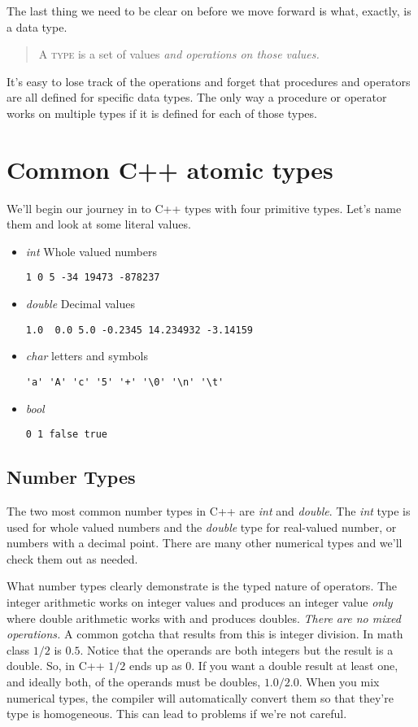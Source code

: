\documentclass[]{tufte-handout}
\begin{document}
The last thing we need to be clear on before we move forward is what, exactly, is a data type.  
\begin{quote}
A \textsc{type} is a set of values \textit{and operations on those values.}  
\end{quote}
It's easy to lose track of the operations and forget that procedures and operators are all defined for specific data types.  The only way a procedure or operator works on multiple types if it is defined for each of those types. 

\section{Common C++ atomic types}

We'll begin our journey in to C++ types with four primitive types.  Let's name them and look at some literal values.
\begin{itemize}
\item \textit{int} Whole valued numbers
\begin{verbatim}
1 0 5 -34 19473 -878237
\end{verbatim}
\item \textit{double} Decimal values
\begin{verbatim}
1.0  0.0 5.0 -0.2345 14.234932 -3.14159
\end{verbatim}
\item \textit{char} letters and symbols
\begin{verbatim}
'a' 'A' 'c' '5' '+' '\0' '\n' '\t'
\end{verbatim}
\item \textit{bool}
\begin{verbatim}
0 1 false true
\end{verbatim}
\end{itemize}

\subsection{Number Types}

The two most common number types in C++ are \textit{int} and \textit{double}. The \textit{int} type is used for whole valued numbers and the \textit{double} type for real-valued number, or numbers with a decimal point. There are many other numerical types and we'll check them out as needed. 

What number types clearly demonstrate is the typed nature of operators. The integer arithmetic works on integer values and produces an integer value \textit{only} where double arithmetic works with and produces doubles. \textit{There are no mixed operations.} A common gotcha that results from this is  integer division.  In math class $1/2$ is $0.5$. Notice that the operands are both integers but the result is a double. So, in C++ $1/2$ ends up as $0$. If you want a double result at least one, and ideally both, of the operands must be doubles, $1.0/2.0$.  When you mix numerical types, the compiler will automatically convert them so that they're type is homogeneous. This can lead to problems if we're not careful. 
\end{document}
